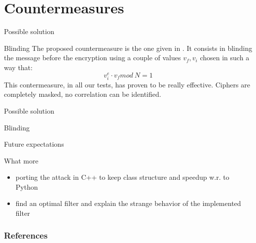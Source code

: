 \documentclass{beamer}
\begin{document}
\nocite{*}




\section{Countermeasures}
\begin{frame}{Possible solution}
    \begin{block}{Blinding}
		The proposed countermeasure is the one given in \cite{kocher1996timing}.
		It consists in blinding the message before the encryption using a couple of values $v_f, v_i$ chosen in such a way that:
		\begin{equation*}
			v_i^e \cdot v_f mod\: N = 1
		\end{equation*}
        This contermeasure, in all our tests, has proven to be really effective. Ciphers are completely masked, no correlation can be identified.
    \end{block}
\end{frame}

\begin{frame}{Possible solution}
    \begin{block}{Blinding}

    \end{block}
\end{frame}

\begin{frame}{Future expectations}
  \begin{block}{What more}
    \begin{itemize}
      \item porting the attack in C++ to keep class structure and speedup w.r. to Python
      \item find an optimal filter and explain the strange behavior of the implemented filter

    \end{itemize}

  \end{block}
\end{frame}

\begin{frame}[allowframebreaks]
	\frametitle{References}
	\footnotesize
	
	
\end{frame}
\end{document}
